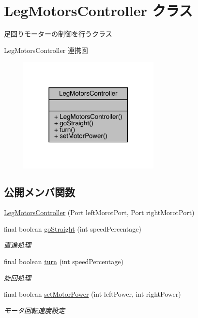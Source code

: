 \hypertarget{class_leg_motors_controller}{}\section{Leg\+Motors\+Controller クラス}
\label{class_leg_motors_controller}


足回りモーターの制御を行うクラス  




Leg\+Motors\+Controller 連携図
\nopagebreak
\begin{figure}[H]
\begin{center}
\leavevmode
\includegraphics[width=202pt]{d4/d01/class_leg_motors_controller__coll__graph}
\end{center}
\end{figure}
\subsection*{公開メンバ関数}
\begin{DoxyCompactItemize}
\item 
\mbox{\hyperlink{class_leg_motors_controller_afb404bdad1a5ce5d9f71b73ade3ccbb5}{Leg\+Motors\+Controller}} (Port left\+Morot\+Port, Port right\+Morot\+Port)
\item 
final boolean \mbox{\hyperlink{class_leg_motors_controller_ad5a3db7ac941bb2e66d3efb5e3214a54}{go\+Straight}} (int speed\+Percentage)
\begin{DoxyCompactList}\small\item\em 直進処理 \end{DoxyCompactList}\item 
final boolean \mbox{\hyperlink{class_leg_motors_controller_a0df4b63d6a21857d8b5fbff3875ff962}{turn}} (int speed\+Percentage)
\begin{DoxyCompactList}\small\item\em 旋回処理 \end{DoxyCompactList}\item 
final boolean \mbox{\hyperlink{class_leg_motors_controller_ae5857bf258e2820255f1b5775140385a}{set\+Motor\+Power}} (int left\+Power, int right\+Power)
\begin{DoxyCompactList}\small\item\em モータ回転速度設定 \end{DoxyCompactList}\end{DoxyCompactItemize}


